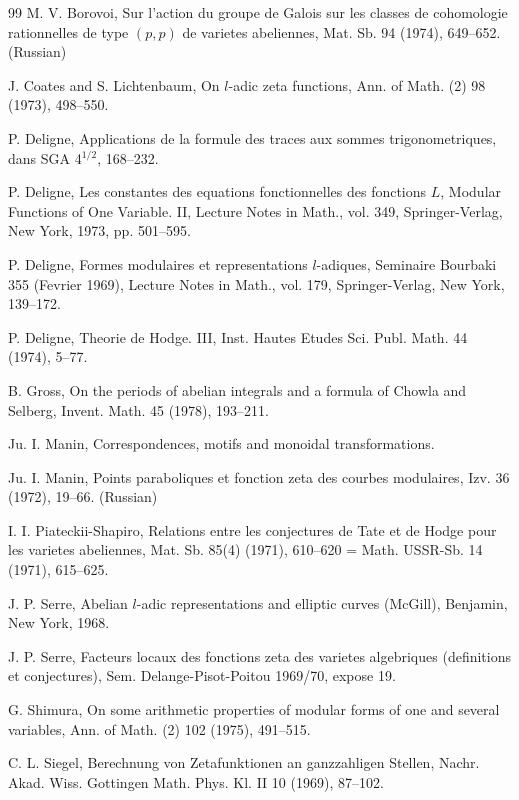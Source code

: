 \documentclass[12pt,a4paper]{article}
\theoremstyle{plain}
\theoremstyle{definition}
\theoremstyle{remark}
\begin{document}
\begin{thebibliography}{99}
M. V. Borovoi, Sur l'action du groupe de Galois sur les classes de cohomologie rationnelles
de type $(p,p)$ de varietes abeliennes, Mat. Sb. 94 (1974), 649--652. (Russian)

J. Coates and S. Lichtenbaum, On $l$-adic zeta functions, Ann. of Math. (2) 98 (1973), 498--550.

P. Deligne, Applications de la formule des traces aux sommes trigonometriques, dans SGA
4$^{1/2}$, 168--232.

P. Deligne, Les constantes des equations fonctionnelles des fonctions $L$, Modular Functions
of One Variable. II, Lecture Notes in Math., vol. 349, Springer-Verlag, New York, 1973,
pp. 501--595.

P. Deligne, Formes modulaires et representations $l$-adiques, Seminaire Bourbaki 355
(Fevrier 1969), Lecture Notes in Math., vol. 179, Springer-Verlag, New York, 139--172.

P. Deligne, Theorie de Hodge. III, Inst. Hautes Etudes Sci. Publ. Math. 44 (1974), 5--77.

B. Gross, On the periods of abelian integrals and a formula of Chowla and Selberg, Invent.
Math. 45 (1978), 193--211.

Ju. I. Manin, Correspondences, motifs and monoidal transformations.

Ju. I. Manin, Points paraboliques et fonction zeta des courbes modulaires, Izv. 36 (1972), 19--66. (Russian)

I. I. Piateckii-Shapiro, Relations entre les conjectures de Tate et de Hodge pour les
varietes abeliennes, Mat. Sb. 85(4) (1971), 610--620 = Math. USSR-Sb. 14 (1971), 615--625.

J. P. Serre, Abelian $l$-adic representations and elliptic curves (McGill), Benjamin, New York, 1968.

J. P. Serre, Facteurs locaux des fonctions zeta des varietes algebriques (definitions et
conjectures), Sem. Delange-Pisot-Poitou 1969/70, expose 19.

G. Shimura, On some arithmetic properties of modular forms of one and several variables,
Ann. of Math. (2) 102 (1975), 491--515.

C. L. Siegel, Berechnung von Zetafunktionen an ganzzahligen Stellen, Nachr. Akad. Wiss.
Gottingen Math. Phys. Kl. II 10 (1969), 87--102.


\end{thebibliography}
\end{document}
